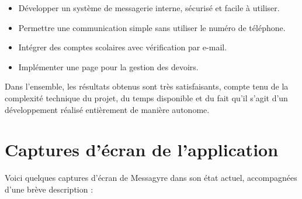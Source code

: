 \documentclass[12pt]{report}
\begin{document}
\begin{itemize}
	\item Développer un système de messagerie interne, sécurisé et facile à utiliser.
	\item Permettre une communication simple sans utiliser le numéro de téléphone.
	\item Intégrer des comptes scolaires avec vérification par e-mail.
	\item Implémenter une page pour la gestion des devoirs.
\end{itemize}

Dans l’ensemble, les résultats obtenus sont très satisfaisants, compte tenu de la complexité technique du projet, du temps disponible et du fait qu’il s’agit d’un développement réalisé entièrement de manière autonome.

\section{Captures d’écran de l’application}

Voici quelques captures d’écran de Messagyre dans son état actuel, accompagnées d’une brève description :
\end{document}
